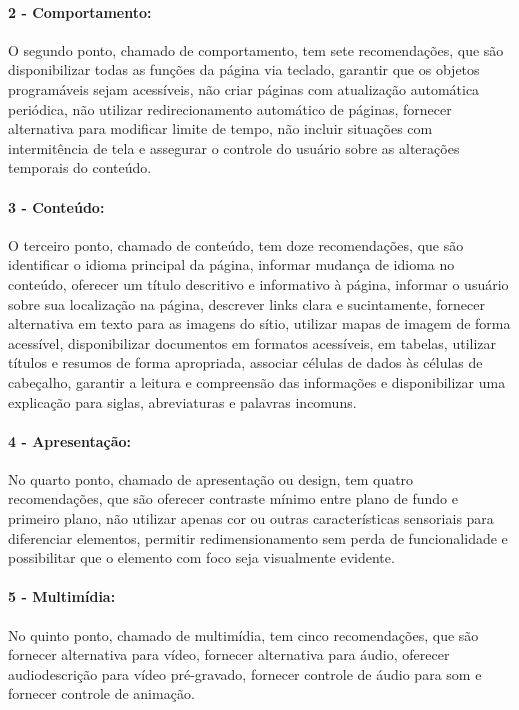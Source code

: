 \documentclass[a4paper]{article}
\begin{document}
\begin{titlepage}
\paragraph{2 - Comportamento: }

O segundo ponto, chamado de comportamento, tem sete recomendações, que são disponibilizar todas as funções da página via teclado, garantir que os objetos programáveis sejam acessíveis, não criar páginas com atualização automática periódica, não utilizar redirecionamento automático de páginas, fornecer alternativa para modificar limite de tempo, não incluir situações com intermitência de tela e assegurar o controle do usuário sobre as alterações temporais do conteúdo.

\paragraph{3 - Conteúdo: }

O terceiro ponto, chamado de conteúdo, tem doze recomendações, que são identificar o idioma principal da página, informar mudança de idioma no conteúdo, oferecer um título descritivo e informativo à página, informar o usuário sobre sua localização na página, descrever links clara e sucintamente, fornecer alternativa em texto para as imagens do sítio, utilizar mapas de imagem de forma acessível, disponibilizar documentos em formatos acessíveis, em tabelas, utilizar títulos e resumos de forma apropriada, associar células de dados às células de cabeçalho, garantir a leitura e compreensão das informações e disponibilizar uma explicação para siglas, abreviaturas e palavras incomuns.

\paragraph{4 - Apresentação: }

No quarto ponto, chamado de apresentação ou design, tem quatro recomendações, que são oferecer contraste mínimo entre plano de fundo e primeiro plano, não utilizar apenas cor ou outras características sensoriais para diferenciar elementos, permitir redimensionamento sem perda de funcionalidade e possibilitar que o elemento com foco seja visualmente evidente.

\paragraph{5 - Multimídia: }

No quinto ponto, chamado de multimídia, tem cinco recomendações, que são fornecer alternativa para vídeo, fornecer alternativa para áudio, oferecer audiodescrição para vídeo pré-gravado, fornecer controle de áudio para som e fornecer controle de animação.


\end{titlepage}
\end{document}
